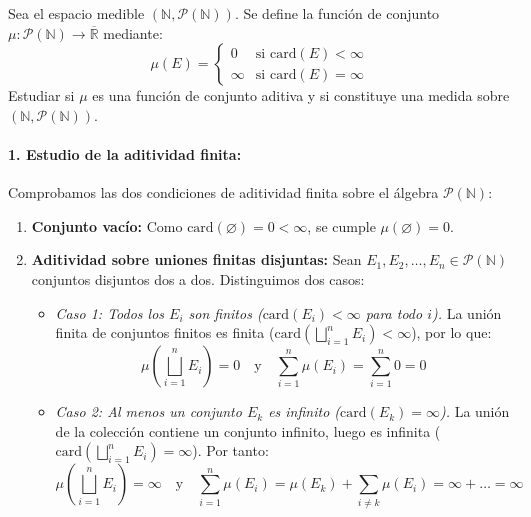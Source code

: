 \newpage
\begin{problema}
Sea el espacio medible $(\mathbb{N}, \mathcal{P}(\mathbb{N}))$. Se define la función de conjunto $\mu : \mathcal{P}(\mathbb{N}) \to \overline{\mathbb{R}}$ mediante:
\[
    \mu(E) = \begin{cases} 0 & \text{si } \mathrm{card}(E) < \infty \\ \infty & \text{si } \mathrm{card}(E) = \infty \end{cases}
\]
Estudiar si $\mu$ es una función de conjunto aditiva y si constituye una medida sobre $(\mathbb{N}, \mathcal{P}(\mathbb{N}))$.

\tcblower

\paragraph{1. Estudio de la aditividad finita:}
Comprobamos las dos condiciones de aditividad finita sobre el álgebra $\mathcal{P}(\mathbb{N})$:
\begin{enumerate}[label=\arabic*.]
    \item \textbf{Conjunto vacío:} Como $\mathrm{card}(\varnothing) = 0 < \infty$, se cumple $\mu(\varnothing) = 0$.
    \item \textbf{Aditividad sobre uniones finitas disjuntas:}
    Sean $E_1, E_2, \dots, E_n \in \mathcal{P}(\mathbb{N})$ conjuntos disjuntos dos a dos. Distinguimos dos casos:
    \begin{itemize}
        \item \textit{Caso 1: Todos los $E_i$ son finitos ($\mathrm{card}(E_i) < \infty$ para todo $i$).}
        La unión finita de conjuntos finitos es finita ($\mathrm{card}(\bigsqcup_{i=1}^n E_i) < \infty$), por lo que:
        \[
            \mu\left( \bigsqcup_{i=1}^n E_i \right) = 0 \quad \text{y} \quad \sum_{i=1}^n \mu(E_i) = \sum_{i=1}^n 0 = 0
        \]
        \item \textit{Caso 2: Al menos un conjunto $E_{k}$ es infinito ($\mathrm{card}(E_{k}) = \infty$).}
        La unión de la colección contiene un conjunto infinito, luego es infinita ($\mathrm{card}(\bigsqcup_{i=1}^n E_i) = \infty$). Por tanto:
        \[
            \mu\left( \bigsqcup_{i=1}^n E_i \right) = \infty \quad \text{y} \quad \sum_{i=1}^n \mu(E_i) = \mu(E_k) + \sum_{i \neq k} \mu(E_i) = \infty + \dots = \infty
        \]
    \end{itemize}
\end{enumerate}


\end{problema}
